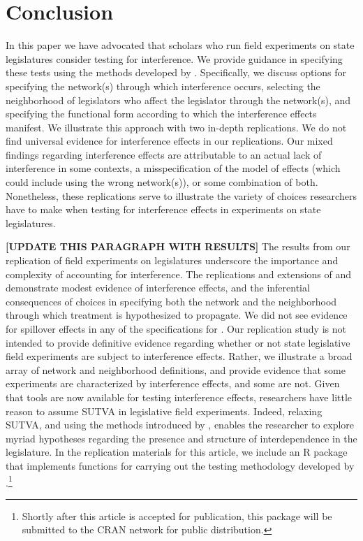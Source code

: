 \documentclass[12pt]{article}
\begin{document}
\section{Conclusion}


In this paper we have advocated that scholars who run field experiments on state legislatures consider testing for interference. We provide guidance in specifying these tests using the methods developed by  \citet{bowers2012reasoning}. Specifically, we discuss options for specifying the network(s) through which interference occurs, selecting the neighborhood of legislators who affect the legislator through the network(s), and specifying the functional form according to which the interference effects manifest. We illustrate this approach with two in-depth replications. We do not find universal evidence for interference effects in our replications. Our mixed findings regarding interference effects are attributable to an actual lack of interference in some contexts, a misspecification of the model of effects (which could include using the wrong network(s)), or some combination of both.  Nonetheless, these replications serve to illustrate the variety of choices researchers have to make when testing for interference effects in experiments on state legislatures. 

{\bf [UPDATE THIS PARAGRAPH WITH RESULTS]}
The results from our replication of field experiments on legislatures underscore the importance and complexity of accounting for interference. The replications and extensions of \citet{coppock2014information} and \citet{broockman2013black} demonstrate modest evidence of interference effects, and the inferential consequences of choices in specifying both the network and the neighborhood through which treatment is hypothesized to propagate. We did not see evidence for spillover effects in any of the specifications for \citet{bergan2015call}.  Our replication study is not intended to provide definitive evidence regarding whether or not state legislative field experiments are subject to interference effects. Rather, we illustrate a broad array of network and neighborhood definitions, and provide evidence that some experiments are characterized by interference effects, and some are not. Given that tools are now available for testing interference effects, researchers have little reason to assume SUTVA in legislative field experiments. Indeed, relaxing SUTVA, and using the methods introduced by \citet{bowers2012reasoning}, enables the researcher to explore myriad hypotheses regarding the presence and structure of interdependence in the legislature. In the replication materials for this article, we include an R package that implements functions for carrying out the testing methodology developed by \citet{bowers2012reasoning}.\footnote{Shortly after this article is accepted for publication, this package will be submitted to the CRAN network for public distribution.}
\end{document}
